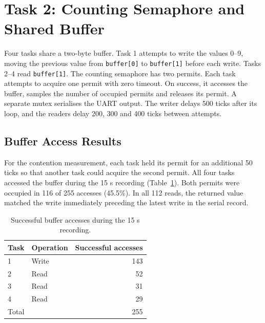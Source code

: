 \documentclass[11pt,a4paper]{article}
\begin{document}


\clearpage
\section{Task 2: Counting Semaphore and Shared Buffer}
Four tasks share a two-byte buffer. Task 1 attempts to write the values 0--9, moving the previous value from \texttt{buffer[0]} to \texttt{buffer[1]} before each write. Tasks 2--4 read \texttt{buffer[1]}. The counting semaphore has two permits. Each task attempts to acquire one permit with zero timeout. On success, it accesses the buffer, samples the number of occupied permits and releases its permit. A separate mutex serialises the UART output. The writer delays 500 ticks after its loop, and the readers delay 200, 300 and 400 ticks between attempts.



\clearpage
\subsection{Buffer Access Results}
For the contention measurement, each task held its permit for an additional 50 ticks so that another task could acquire the second permit. All four tasks accessed the buffer during the 15 s recording (Table~\ref{tab:buffer-results}). Both permits were occupied in 116 of 255 accesses (45.5\%). In all 112 reads, the returned value matched the write immediately preceding the latest write in the serial record.

\begin{table}[H]
\centering
\caption{Successful buffer accesses during the 15 s recording.}
\label{tab:buffer-results}
\begin{tabular}{@{}llr@{}}
\toprule
Task & Operation & Successful accesses \\
\midrule
1 & Write & 143 \\
2 & Read & 52 \\
3 & Read & 31 \\
4 & Read & 29 \\
\midrule
Total & & 255 \\
\bottomrule
\end{tabular}
\end{table}
\end{document}
